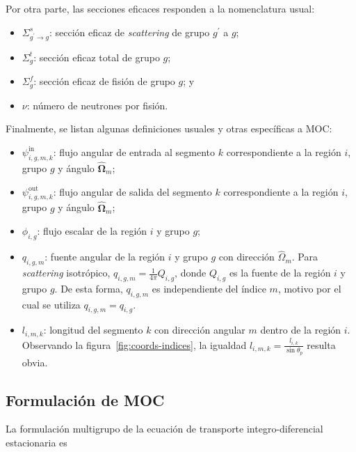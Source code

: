 \documentclass[11pt]{article}
\begin{document}
Por otra parte, las secciones eficaces responden a la nomenclatura usual:

\begin{itemize}
\renewcommand\labelitemi{$\cdot$}
 \item $\Sigma^s_{g^\prime \rightarrow g}$: sección eficaz de \emph{scattering} de grupo $g^\prime$ a $g$;
 \item $\Sigma^t_g$: sección eficaz total de grupo $g$;
 \item $\Sigma^f_g$: sección eficaz de fisión de grupo $g$; y
 \item $\nu$: número de neutrones por fisión.
\end{itemize}

Finalmente, se listan algunas definiciones usuales y otras específicas a MOC:

\begin{itemize}
\renewcommand\labelitemi{$\cdot$}
 \item $\psi^{\text{in}}_{i,g,m,k}$: flujo angular de entrada al segmento $k$ correspondiente a la región $i$, grupo $g$ y ángulo $\boldsymbol{\hat{\Omega}}_m$;
 \item $\psi^{\text{out}}_{i,g,m,k}$: flujo angular de salida del segmento $k$ correspondiente a la región $i$, grupo $g$ y ángulo $\boldsymbol{\hat{\Omega}}_m$;
 \item $\phi_{i,g}$: flujo escalar de la región $i$ y grupo $g$;
 \item $q_{i,g,m}$: fuente angular de la región $i$ y grupo $g$ con dirección $\hat{\Omega}_m$. Para \emph{scattering} isotrópico, $q_{i,g,m} = \frac{1}{4\pi}Q_{i,g}$, donde $Q_{i,g}$ es la fuente de la región $i$ y grupo $g$. De esta forma, $q_{i,g,m}$ es independiente del índice $m$, motivo por el cual se utiliza $q_{i,g,m} = q_{i,g}$.
 \item $l_{i,m,k}$: longitud del segmento $k$ con dirección angular $m$ dentro de la región $i$. Observando la figura~\ref{fig:coords-indices}, la igualdad $l_{i,m,k} = \frac{l_{i,k}}{\sin \theta_p}$ resulta obvia.
\end{itemize}

\subsection{Formulación de MOC}

La formulación multigrupo de la ecuación de transporte integro-diferencial estacionaria es~\cite{henry,lamarsh,duderstadt,glasstone,lewis,stammler,handbook-ingnuclear}
\end{document}
